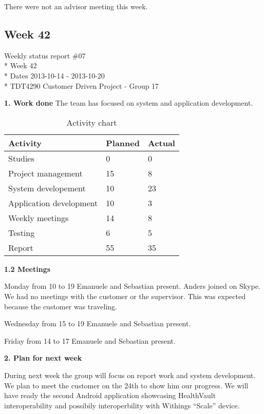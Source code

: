 There were not an advisor meeting this week. 

\newpage
\subsection{Week 42}

\begin{center}
Weekly status report \#07\\*
Week 42 \\*
Dates 2013-10-14 - 2013-10-20 \\*
TDT4290 Customer Driven Project - Group 17
\end{center}

\textbf{1. Work done}
The team has focused on system and application development.

\begin{table}[H]
\begin{center}
\begin{tabular}{ l | l | l }
  \hline
  Activity & Planned & Actual \\
  \hline\noalign{\smallskip}\noalign{\smallskip}\hline
  Studies & 0 & 0 \\
  Project management & 15 & 8 \\
  System developement & 10 & 23 \\
  Application development & 10 & 3 \\
  Weekly meetings & 14 & 8 \\
  Testing & 6 & 5 \\
  Report & 55 & 35 \\
  \hline
\end{tabular}
\end{center}
\caption{Activity chart}
\label{table:activityChartStatusReport}
\end{table}

\textbf{1.2 Meetings}

Monday from 10 to 19
Emanuele and Sebastian present. 
Anders joined on Skype.
We had no meetings with the customer or the supervisor.
This was expected because the customer was traveling.

Wednesday from 15 to 19
Emanuele and Sebastian present.

Friday from 14 to 17
Emanuele and Sebastian present.

\textbf{2. Plan for next week}

During next week the group will focus on report work and system development.
We plan to meet the customer on the 24th to show him our progress.
We will have ready the second Android application showcasing HealthVault interoperability and possibily interoperbility with Withings “Scale” device.

